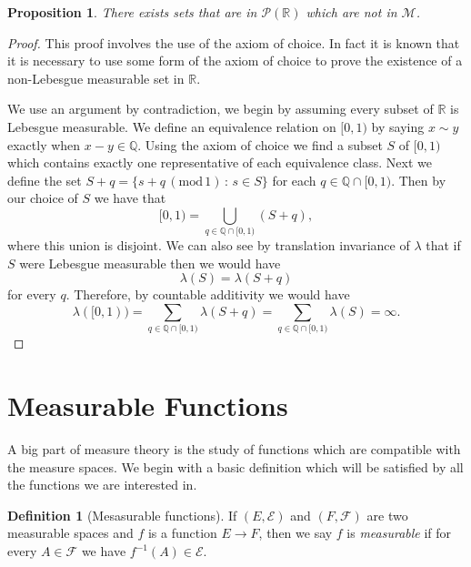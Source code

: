 \documentclass[11pt]{article}
\newtheorem{prp}[thm]{Proposition}
\theoremstyle{definition}
\newtheorem{dfn}[thm]{Definition}
\theoremstyle{remark}
\begin{document}
\begin{prp}
There exists sets that are in $\mathscr{P}(\mathbb{R})$ which are not in $\mathscr{M}$.
\end{prp}
\begin{proof}
This proof involves the use of the axiom of choice. In fact it is known that it is necessary to use some form of the axiom of choice to prove the existence of a non-Lebesgue measurable set in $\mathbb{R}$.

We use an argument by contradiction, we begin by assuming every subset of $\mathbb{R}$ is Lebesgue measurable. We define an equivalence relation on $[0,1)$ by saying $x \sim y$ exactly when $x-y \in \mathbb{Q}$.  Using the axiom of choice we find a subset $S$ of $[0,1)$ which contains exactly one representative of each equivalence class. Next we define the set $S+q = \{ s+q \, (\mbox{mod}\,1) \, : \, s \in S \}$ for each $q \in \mathbb{Q} \cap [0,1)$. Then by our choice of $S$ we have that 
\[ [0,1) = \bigcup_{q \in \mathbb{Q} \cap [0,1)} (S+q), \] where this union is disjoint. We can also see by translation invariance of $\lambda$ that if $S$ were Lebesgue measurable then we would have
\[ \lambda(S) = \lambda(S+q) \] for every $q$. Therefore, by countable additivity we would have
\[ \lambda([0,1)) = \sum_{q \in \mathbb{Q} \cap [0,1)} \lambda (S+q) = \sum_{q \in \mathbb{Q} \cap [0,1)} \lambda(S) = \infty. \]
\end{proof}






\section{Measurable Functions}
A big part of measure theory is the study of functions which are compatible with the measure spaces. We begin with a basic definition which will be satisfied by all the functions we are interested in.

\begin{dfn}[Mesasurable functions]
If $(E, \mathcal{E})$ and $(F, \mathcal{F})$ are two measurable spaces and $f$ is a function $E \rightarrow F$, then we say $f$ is \emph{measurable} if for every $A \in \mathcal{F}$ we have $f^{-1}(A) \in \mathcal{E}$.
\end{dfn}
\end{document}
